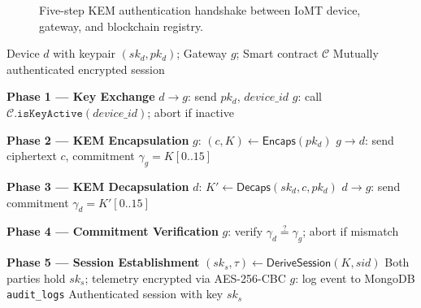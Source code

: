 \documentclass[conference]{IEEEtran}
\begin{document}
\begin{figure}[!t]
\centering
{}
\caption{Five-step KEM authentication handshake between IoMT device, gateway,
and blockchain registry.}
\label{fig:handshake}
\end{figure}

\begin{algorithm}[!t]
\caption{Full IoMT Authentication Protocol}\label{alg:auth}
\begin{algorithmic}[1]
\REQUIRE Device $d$ with keypair $(sk_d, pk_d)$; Gateway $g$; Smart contract $\mathcal{C}$
\ENSURE Mutually authenticated encrypted session

\textbf{Phase 1 — Key Exchange}
\STATE $d \to g$: send $pk_d$, $\mathit{device\_id}$
\STATE $g$: call $\mathcal{C}.\texttt{isKeyActive}(\mathit{device\_id})$; abort if inactive

\textbf{Phase 2 — KEM Encapsulation}
\STATE $g$: $(c, K) \leftarrow \textsf{Encaps}(pk_d)$
\STATE $g \to d$: send ciphertext $c$, commitment $\gamma_g = K[0..15]$

\textbf{Phase 3 — KEM Decapsulation}
\STATE $d$: $K' \leftarrow \textsf{Decaps}(sk_d, c, pk_d)$
\STATE $d \to g$: send commitment $\gamma_d = K'[0..15]$

\textbf{Phase 4 — Commitment Verification}
\STATE $g$: verify $\gamma_d \stackrel{?}{=} \gamma_g$; abort if mismatch

\textbf{Phase 5 — Session Establishment}
\STATE $(sk_s, \tau) \leftarrow \textsf{DeriveSession}(K, \mathit{sid})$
\STATE Both parties hold $sk_s$; telemetry encrypted via \textsf{AES-256-CBC}
\STATE $g$: log event to MongoDB \texttt{audit\_logs}
\RETURN Authenticated session with key $sk_s$
\end{algorithmic}
\end{algorithm}
\end{document}
